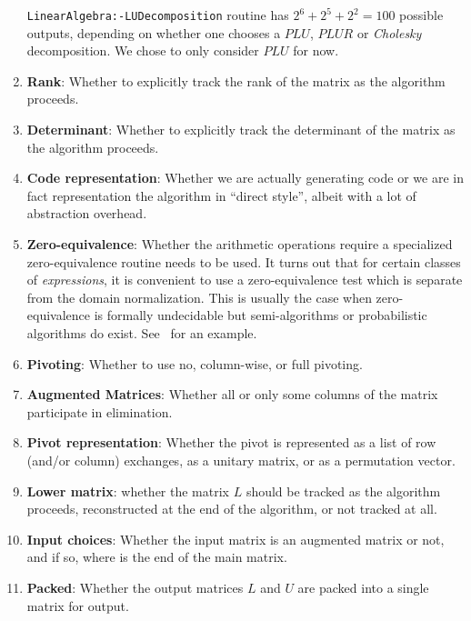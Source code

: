 \documentclass[draft]{elsart}
\begin{document}
\begin{enumerate}
		\texttt{LinearAlgebra:-LUDecomposition} routine has
		$2^6 + 2^5 + 2^2 = 100$ possible outputs, depending on whether
		one chooses a $PLU$, $PLUR$ or \emph{Cholesky} 
		decomposition.  We chose to only consider $PLU$ for now.
	\item \textbf{Rank}: Whether to explicitly track the rank of the matrix
		as the algorithm proceeds.
	\item \textbf{Determinant}:  Whether to explicitly track the determinant
		of the matrix as the algorithm proceeds.
	\item \textbf{Code representation}: Whether we are actually generating
		code or we are in fact representation the algorithm in ``direct
		style'', albeit with a lot of abstraction overhead.
	\item \textbf{Zero-equivalence}: Whether the 
		arithmetic operations require a specialized zero-equivalence 
		routine needs to be used.  It turns out that for certain classes
		of \emph{expressions}, it is convenient to use a zero-equivalence
		test which is separate from the domain normalization.  This is
		usually the case when zero-equivalence is formally undecidable
		but semi-algorithms or probabilistic algorithms do exist.
		See~\cite{ZhCaJeMo06a} for an example.
    \item \textbf{Pivoting}: Whether to use no, 
        column-wise, or full pivoting.
    \item \textbf{Augmented Matrices}: Whether all or only some
      columns of the matrix participate in elimination.
	\item \textbf{Pivot representation}: Whether the pivot is represented
	  as a list of row (and/or column) exchanges, as a unitary matrix,
	  or as a permutation vector.
  \item \textbf{Lower matrix}: whether the matrix $L$ should be tracked
	  as the algorithm proceeds, reconstructed at the end of the
	  algorithm, or not tracked at all.
  \item \textbf{Input choices}: Whether the input matrix is an augmented
	  matrix or not, and if so, where is the end of the main matrix.
  \item \textbf{Packed}: Whether the output matrices $L$ and $U$ are
	  packed into a single matrix for output.
\setcounter{naspects}{\value{enumi}}
\end{enumerate}
\end{document}

